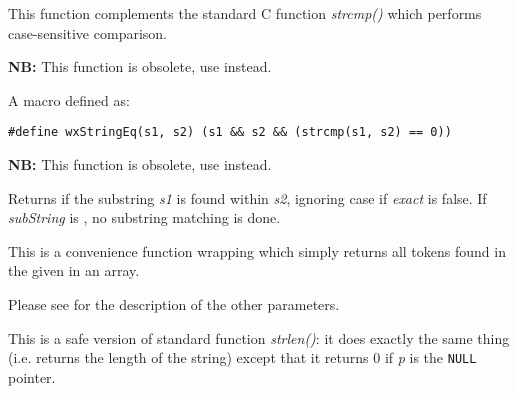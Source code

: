 This function complements the standard C function {\it strcmp()} which performs
case-sensitive comparison.


\label{wxstringeq}


{\bf NB:} This function is obsolete, use  instead.

A macro defined as:

\begin{verbatim}
#define wxStringEq(s1, s2) (s1 && s2 && (strcmp(s1, s2) == 0))
\end{verbatim}


\label{wxstringmatch}


{\bf NB:} This function is obsolete, use  instead.

Returns \true if the substring {\it s1} is found within {\it s2},
ignoring case if {\it exact} is false. If {\it subString} is \false,
no substring matching is done.


\label{wxstringtokenize}


This is a convenience function wrapping
 which simply returns all tokens
found in the given  in an array.

Please see
for the description of the other parameters.


\label{wxstrlen}


This is a safe version of standard function {\it strlen()}: it does exactly the
same thing (i.e. returns the length of the string) except that it returns 0 if
{\it p} is the {\tt NULL} pointer.


